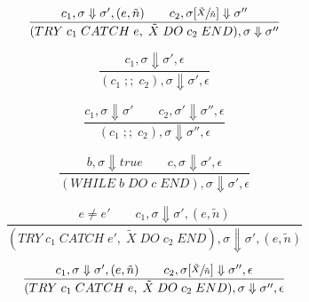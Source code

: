 \begin{equation}
\frac{c_1, \sigma \Downarrow \sigma', (e, \tilde{n}) \qquad c_2, \sigma[\sfrac{\tilde{X}}{\tilde{n}}] \Downarrow \sigma''}{(TRY\; c_1\; CATCH\; e,\; \tilde{X}\; DO\; c_2\; END), \sigma \Downarrow \sigma''}
\end{equation}

\begin{equation}
\frac{c_1, \sigma \Downarrow \sigma', \epsilon}{(c_1\; ;;\; c_2), \sigma \Downarrow \sigma', \epsilon}
\end{equation}

\begin{equation}
\frac{c_1, \sigma \Downarrow \sigma' \qquad c_2, \sigma' \Downarrow \sigma'', \epsilon}{(c_1\; ;;\; c_2), \sigma \Downarrow \sigma'', \epsilon}
\end{equation}

\begin{equation}
\frac{b, \sigma \Downarrow true \qquad c, \sigma \Downarrow \sigma', \epsilon}{(WHILE\; b\; DO\; c\; END), \sigma \Downarrow \sigma', \epsilon}
\end{equation}

\begin{equation}
\frac{e \neq e' \qquad c_1, \sigma \Downarrow \sigma', (e, \tilde{n})}{(TRY\; c_1\; CATCH\; e',\; \tilde{X}\; DO\; c_2\; END), \sigma \Downarrow \sigma', (e, \tilde{n})}
\end{equation}

\begin{equation}
\frac{c_1, \sigma \Downarrow \sigma', (e, \tilde{n}) \qquad c_2, \sigma[\sfrac{\tilde{X}}{\tilde{n}}] \Downarrow \sigma'', \epsilon}{(TRY\; c_1\; CATCH\; e,\; \tilde{X}\; DO\; c_2\; END), \sigma \Downarrow \sigma'', \epsilon}
\end{equation}